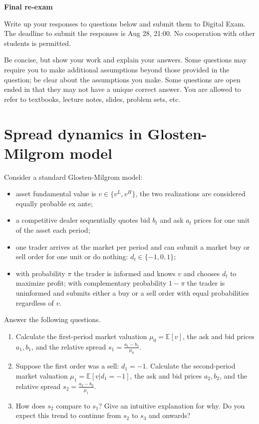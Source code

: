 \documentclass[a4paper]{article}
\newif\ifsolutions
\begin{document}
{\ifsolutions \else	
	
\fi}

\begin{center}
		\LARGE\textbf{Final re-exam {\ifsolutions solutions \fi}}
\end{center}

{\ifsolutions \else	
Write up your responses to questions below and submit them to Digital Exam. The deadline to submit the responses is Aug 28, 21:00. No cooperation with other students is permitted.

Be concise, but show your work and explain your answers. Some questions may require you to make additional assumptions beyond those provided in the question; be clear about the assumptions you make. Some questions are open ended in that they may not have a unique correct answer. You are allowed to refer to textbooks, lecture notes, slides, problem sets, etc.
\fi}



\section{Spread dynamics in Glosten-Milgrom model}

Consider a standard Glosten-Milgrom model:
\begin{itemize}
	\item asset fundamental value is $v \in \{v^L, v^H\}$, the two realizations are considered equally probable ex ante;
	\item a competitive dealer sequentially quotes bid $b_t$ and ask $a_t$ prices for one unit of the asset each period;
	\item one trader arrives at the market per period and can submit a market buy or sell order for one unit or do nothing: $d_t \in \{-1,0,1\}$; 
	\item with probability $\pi$ the trader is informed and knows $v$ and chooses $d_t$ to maximize profit; with complementary probability $1-\pi$ the trader is uninformed and submits either a buy or a sell order with equal probabilities regardless of $v$.
\end{itemize}
Answer the following questions.

\begin{enumerate}
	\item Calculate the first-period market valuation $\mu_0 = \mathbb{E} [v]$, the ask and bid prices $a_1, b_1$, and the relative spread $s_1 = \frac{a_1-b_1}{\mu_0}$.
	\item Suppose the first order was a sell: $d_1 = -1$. Calculate the second-period market valuation $\mu_1 = \mathbb{E} [v | d_1 = -1]$, the ask and bid prices $a_2, b_2$, and the relative spread $s_2 = \frac{a_2-b_2}{\mu_1}$.
	\item How does $s_2$ compare to $s_1$? Give an intuitive explanation for why. Do you expect this trend to continue from $s_2$ to $s_3$ and onwards?
\end{enumerate}
\end{document}
